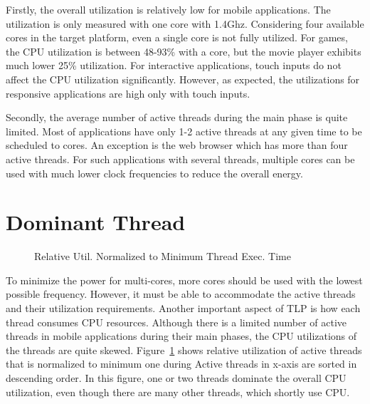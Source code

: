 Firstly, the overall utilization is relatively low for mobile applications. The utilization is
only measured with one core with 1.4Ghz. Considering four available cores in the target platform,
even a single core is not fully utilized. For games, the CPU utilization is between 48-93\%
with a core, but the movie player exhibits much lower 25\% utilization. For interactive
applications, touch inputs do not affect the CPU utilization significantly. However, as expected,
the utilizations for responsive applications are high only with touch inputs. 

Secondly, the average number of active threads during the main phase is quite limited. Most
of applications have only 1-2 active threads at any given time to be scheduled to cores. 
An exception is the web browser which has more than four active threads. For such applications
with several threads, multiple cores can be used with much lower clock frequencies to reduce
the overall energy.

\section{Dominant Thread}



\begin{figure}[relative_util]
\begin{center}
\vspace{-0.2in}
\end{center}
\caption{Relative Util. Normalized to Minimum Thread Exec. Time}
\label{fig:relative_util}
\end{figure}



To minimize the power for multi-cores, more cores should be used with the lowest possible frequency.
However, it must be able to accommodate the active threads and their utilization requirements. 
Another important aspect of TLP is how each thread consumes CPU resources. Although there is 
a limited number of active threads in mobile applications during their main phases, the CPU utilizations
of the threads are quite skewed. 
Figure~\ref{fig:relative_util} shows  relative utilization of active threads that is normalized to minimum one during 
Active threads in x-axis are sorted in descending order.
In this figure, one or two threads dominate the overall CPU utilization, even though
there are many other threads, which shortly use CPU.

